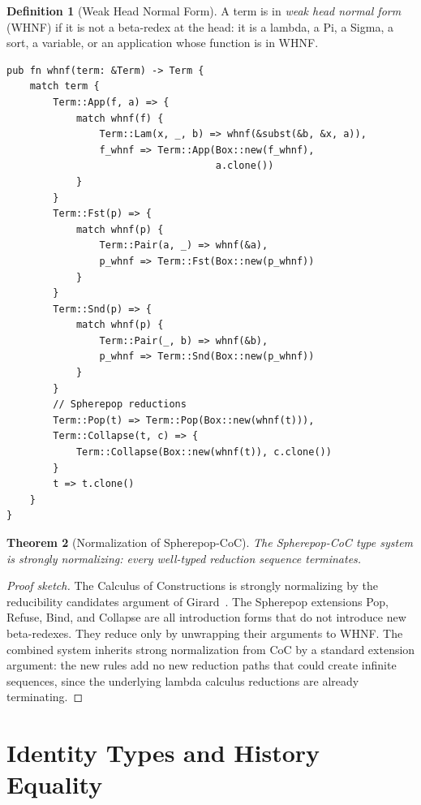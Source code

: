 \documentclass[12pt, a4paper, openany]{book}
\theoremstyle{plain}
\newtheorem{theorem}{Theorem}[chapter]
\theoremstyle{definition}
\newtheorem{definition}[theorem]{Definition}
\theoremstyle{remark}
\begin{document}
\begin{definition}[Weak Head Normal Form]
A term is in \emph{weak head normal form} (WHNF) if it is not a beta-redex at
the head: it is a lambda, a Pi, a Sigma, a sort, a variable, or an application
whose function is in WHNF.
\end{definition}

\begin{lstlisting}[style=rust, caption={WHNF reduction for Spherepop-CoC}]
pub fn whnf(term: &Term) -> Term {
    match term {
        Term::App(f, a) => {
            match whnf(f) {
                Term::Lam(x, _, b) => whnf(&subst(&b, &x, a)),
                f_whnf => Term::App(Box::new(f_whnf),
                                    a.clone())
            }
        }
        Term::Fst(p) => {
            match whnf(p) {
                Term::Pair(a, _) => whnf(&a),
                p_whnf => Term::Fst(Box::new(p_whnf))
            }
        }
        Term::Snd(p) => {
            match whnf(p) {
                Term::Pair(_, b) => whnf(&b),
                p_whnf => Term::Snd(Box::new(p_whnf))
            }
        }
        // Spherepop reductions
        Term::Pop(t) => Term::Pop(Box::new(whnf(t))),
        Term::Collapse(t, c) => {
            Term::Collapse(Box::new(whnf(t)), c.clone())
        }
        t => t.clone()
    }
}
\end{lstlisting}

\begin{theorem}[Normalization of Spherepop-CoC]
The Spherepop-CoC type system is strongly normalizing: every well-typed
reduction sequence terminates.
\end{theorem}

\begin{proof}[Proof sketch]
The Calculus of Constructions is strongly normalizing by the reducibility
candidates argument of Girard~\cite{girard89}. The Spherepop extensions Pop,
Refuse, Bind, and Collapse are all introduction forms that do not introduce
new beta-redexes. They reduce only by unwrapping their arguments to WHNF.
The combined system inherits strong normalization from CoC by a standard
extension argument: the new rules add no new reduction paths that could create
infinite sequences, since the underlying lambda calculus reductions are already
terminating.
\end{proof}

\section{Identity Types and History Equality}
\end{document}
